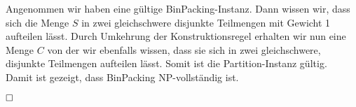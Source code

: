 \documentclass[12pt]{scrartcl}%
\theoremstyle{nonumberplain}
\begin{document}
Angenommen wir haben eine gültige {\sc BinPacking}-Instanz. Dann wissen wir, dass sich die Menge $S$ in zwei gleichschwere disjunkte Teilmengen mit Gewicht 1 aufteilen lässt. Durch Umkehrung der Konstruktionsregel erhalten wir nun eine Menge $C$ von der wir ebenfalls wissen, dass sie sich in zwei gleichschwere, disjunkte Teilmengen aufteilen lässt. Somit ist die {\sc Partition}-Instanz gültig.\\

Damit ist gezeigt, dass {\sc BinPacking} NP-vollständig ist.

$\hfill \square$ 
\end{document}
